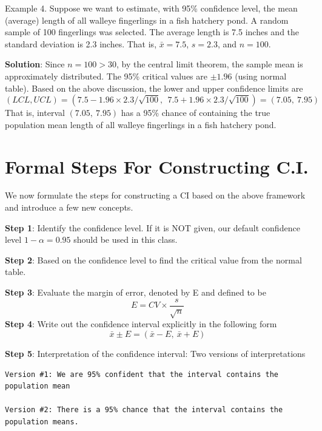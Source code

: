 \documentclass[
]{book}
\begin{document}
\hfill\break

Example 4. Suppose we want to estimate, with 95\% confidence level, the mean (average) length of all walleye fingerlings in a fish hatchery pond. A random sample of 100 fingerlings was selected. The average length is 7.5 inches and the standard deviation is 2.3 inches. That is, \(\bar{x} = 7.5\), \(s = 2.3\), and \(n = 100\).

\textbf{Solution}: Since \(n = 100 > 30\), by the central limit theorem, the sample mean is approximately distributed. The 95\% critical values are \(\pm 1.96\) (using normal table). Based on the above discussion, the lower and upper confidence limits are
\[
(LCL, UCL) = (7.5 - 1.96\times 2.3/\sqrt{100}, \ \ 7.5 + 1.96\times 2.3/\sqrt{100}) = (7.05, \ 7.95)
\]
That is, interval \((7.05, \ 7.95)\) has a 95\% chance of containing the true population mean length of all walleye fingerlings in a fish hatchery pond.

\hfill\break

\hypertarget{formal-steps-for-constructing-c.i.}{%
\section{Formal Steps For Constructing C.I.}\label{formal-steps-for-constructing-c.i.}}

We now formulate the steps for constructing a CI based on the above framework and introduce a few new concepts.

\textbf{Step 1}: Identify the confidence level. If it is NOT given, our default confidence level \(1 - \alpha = 0.95\) should be used in this class.

\textbf{Step 2}: Based on the confidence level to find the critical value from the normal table.

\textbf{Step 3}: Evaluate the margin of error, denoted by E and defined to be
\[
E = CV \times \frac{s}{\sqrt{n}}
\]
\textbf{Step 4}: Write out the confidence interval explicitly in the following form
\[
\bar{x} \pm E = (\bar{x} - E, \ \bar{x} + E)
\]

\textbf{Step 5}: Interpretation of the confidence interval: Two versions of interpretations

\begin{verbatim}
Version #1: We are 95% confident that the interval contains the population mean

Version #2: There is a 95% chance that the interval contains the population means.
\end{verbatim}
\end{document}
